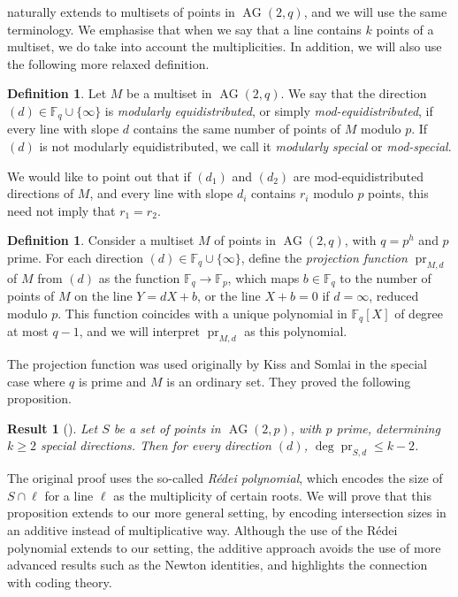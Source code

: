 \documentclass[12pt, a4paper]{article}
\newtheorem{res}[thm]{Result}
\theoremstyle{definition}
\newtheorem{df}[thm]{Definition}
\newcommand{\FF}{\mathbb F}
\newcommand{\fqi}{\FF_q \cup \{\infty\}}
\DeclareMathOperator{\pr}{pr}
\DeclareMathOperator{\AG}{AG}
\newcommand{\ag}{\AG}
\begin{document}
 naturally extends to multisets of points in $\ag(2,q)$, and we will use the same terminology.
We emphasise that when we say that a line contains $k$ points of a multiset, we do take into account the multiplicities.
In addition, we will also use the following more relaxed definition.

\begin{df}
 Let $M$ be a multiset in $\ag(2,q)$.
 We say that the direction $(d) \in \fqi$ is \emph{modularly equidistributed}, or simply \emph{mod-equidistributed}, if every line with slope $d$ contains the same number of points of $M$ modulo $p$.
 If $(d)$ is not modularly equidistributed, we call it \emph{modularly special} or \emph{mod-special}.
\end{df}

We would like to point out that if $(d_1)$ and $(d_2)$ are mod-equidistributed directions of $M$, and every line with slope $d_i$ contains $r_i$ modulo $p$ points, this need not imply that $r_1 = r_2$.

\begin{df}
 \label{Df:Pr}
Consider a multiset $M$ of points in $\ag(2,q)$, with $q=p^h$ and $p$ prime.
For each direction $(d) \in \FF_q \cup \{\infty\}$, define the \emph{projection function} $\pr_{M,d}$ of $M$ from $(d)$ as the function $\FF_q \to \FF_p$, which maps $b \in \FF_q$ to the number of points of $M$ on the line $Y = dX+b$, or the line $X+b=0$ if $d = \infty$, reduced modulo $p$.
This function coincides with a unique polynomial in $\FF_q[X]$ of degree at most $q-1$, and we will interpret $\pr_{M,d}$ as this polynomial.
\end{df}

The projection function was used originally by Kiss and Somlai in the special case where $q$ is prime and $M$ is an ordinary set.
They proved the following proposition.

\begin{res}[{\cite[Proposition 3.1]{Kiss:Somlai}}]
 Let $S$ be a set of points in $\ag(2,p)$, with $p$ prime, determining $k \geq 2$ special directions.
 Then for every direction $(d)$, $\deg \pr_{S,d} \leq k-2$.
\end{res}

The original proof uses the so-called \emph{R\'edei polynomial}, which encodes the size of $S \cap \ell$ for a line $\ell$ as the multiplicity of certain roots.
We will prove that this proposition extends to our more general setting, by encoding intersection sizes in an additive instead of multiplicative way.
Although the use of the R\'edei polynomial extends to our setting, the additive approach avoids the use of more advanced results such as the Newton identities, and highlights the connection with coding theory.
\end{document}
